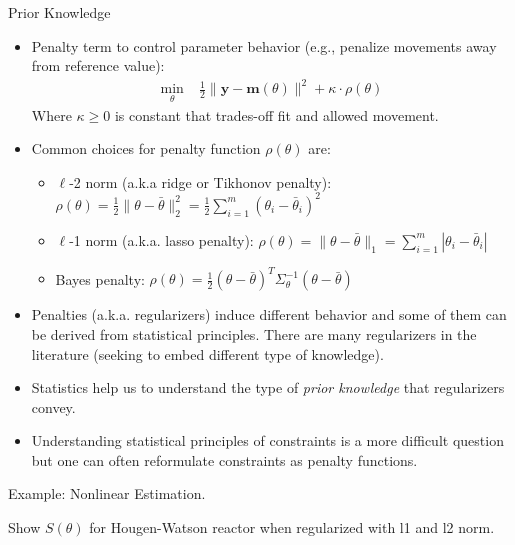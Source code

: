 \documentclass[9pt]{beamer}
\begin{document}
%
\begin{frame}{Prior Knowledge}

\begin{itemize}
\item Penalty term to control parameter behavior (e.g., penalize movements away from reference value):
\begin{align*}
\min_{\theta}& \; \frac{1}{2}\|\mathbf{y}- \mathbf{m}(\theta)\|^2+\kappa\cdot  \rho(\theta)
\end{align*}
Where $\kappa\geq 0$ is constant that trades-off fit and allowed movement. 
\item Common choices for penalty function $\rho(\theta)$ are:
\begin{itemize}
\item  $\ell$-2 norm (a.k.a ridge or Tikhonov penalty): $\rho(\theta)=\frac{1}{2}\|\theta-\bar{\theta}\|_2^2=\frac{1}{2}\sum_{i=1}^m(\theta_i-\bar{\theta}_i)^2$
\item $\ell$-1 norm (a.k.a. lasso penalty): $\rho(\theta)=\|\theta-\bar{\theta}\|_1=\sum_{i=1}^m
|\theta_i-\bar{\theta}_i|$
\item Bayes penalty: $\rho(\theta)=\frac{1}{2}(\theta-\bar{\theta})^T\Sigma_\theta^{-1} (\theta -\bar{\theta})$
\end{itemize}
\item Penalties  (a.k.a. regularizers) induce different behavior and some of them can be derived from statistical principles. There are many regularizers in the literature (seeking to embed different type of knowledge).
\item Statistics help us to understand the type of {\em prior knowledge} that regularizers convey. 
\item Understanding statistical principles of constraints is a more difficult question but one can often reformulate constraints as penalty functions. 
\end{itemize}

\end{frame}

%
\begin{frame}{Example: Nonlinear Estimation.}

\begin{block}{}
Show $S(\theta)$ for Hougen-Watson reactor when regularized with l1 and l2 norm. 
\end{block}

\end{frame}
\end{document}
